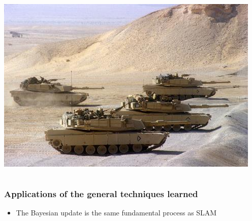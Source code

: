 \begin{frame}
\begin{columns}
\begin{column}{0.5\textwidth}
    \includegraphics[width=\textwidth]{img/tanks.jpg}
    \end{column}
  \end{columns}
\end{frame}

\begin{frame}
  \frametitle{Applications of the general techniques learned}
  \begin{itemize}
    \item The Bayesian update is the same fundamental process as SLAM
  \end{itemize}
\end{frame}
